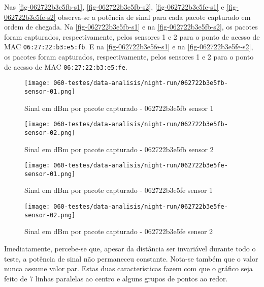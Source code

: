 Nas \autoref{fig-062722b3e5fb-s1}, \autoref{fig-062722b3e5fb-s2},
\autoref{fig-062722b3e5fe-s1} e \autoref{fig-062722b3e5fe-s2} observa-se a
potência de sinal para cada pacote capturado em ordem de chegada. Na
\autoref{fig-062722b3e5fb-s1} e na \autoref{fig-062722b3e5fb-s2}, os pacotes
foram capturados, respectivamente, pelos sensores 1 e 2 para o ponto de acesso
de MAC \texttt{06:27:22:b3:e5:fb}. E na \autoref{fig-062722b3e5fe-s1} e na
\autoref{fig-062722b3e5fe-s2}, os pacotes foram capturados, respectivamente,
pelos sensores 1 e 2 para o ponto de acesso de MAC \texttt{06:27:22:b3:e5:fe}.

\begin{figure}[htb]
	\centering
	\caption{\label{fig-062722b3e5fb-s1}Sinal em dBm por pacote capturado - 062722b3e5fb sensor 1}
	\texttt{[image: 060-testes/data-analisis/night-run/062722b3e5fb-sensor-01.png]}
\end{figure}

\begin{figure}[htb]
	\centering
	\caption{\label{fig-062722b3e5fb-s2}Sinal em dBm por pacote capturado - 062722b3e5fb sensor 2}
	\texttt{[image: 060-testes/data-analisis/night-run/062722b3e5fb-sensor-02.png]}
\end{figure}

\begin{figure}[htb]
	\centering
	\caption{\label{fig-062722b3e5fe-s1}Sinal em dBm por pacote capturado - 062722b3e5fe sensor 1}
	\texttt{[image: 060-testes/data-analisis/night-run/062722b3e5fe-sensor-01.png]}
\end{figure}

\FloatBarrier

\begin{figure}[htb]
	\centering
	\caption{\label{fig-062722b3e5fe-s2}Sinal em dBm por pacote capturado - 062722b3e5fe sensor 2}
	\texttt{[image: 060-testes/data-analisis/night-run/062722b3e5fe-sensor-02.png]}
\end{figure}

Imediatamente, percebe-se que, apesar da distância ser invariável durante todo o
teste, a potência de sinal não permaneceu constante. Nota-se também que o valor
nunca assume valor par. Estas duas características fazem com que o gráfico seja
feito de 7 linhas paralelas ao centro e alguns grupos de pontos ao redor.

